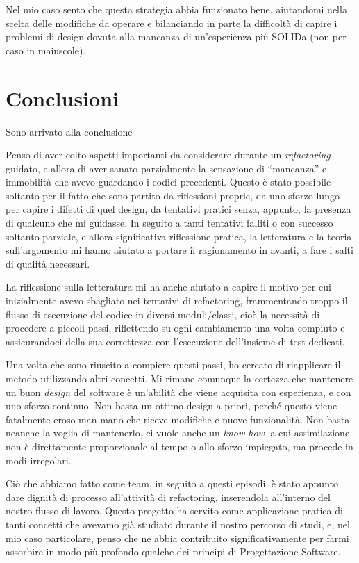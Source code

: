\documentclass[12pt]{report}
\begin{document}
Nel mio caso sento che questa strategia abbia funzionato bene, aiutandomi
nella scelta delle modifiche da operare e bilanciando in parte la
difficoltà di capire i problemi di design dovuta alla mancanza di un'esperienza
più SOLIDa (non per caso in maiuscole).

\chapter{Conclusioni}

Sono arrivato alla conclusione

Penso di aver colto aspetti importanti da considerare durante un 
\textit{refactoring} guidato, e allora di aver sanato parzialmente la
sensazione di ``mancanza'' e immobilità che avevo guardando i codici 
precedenti. Questo è stato possibile soltanto per il fatto che sono 
partito da riflessioni proprie, da uno sforzo lungo per capire i 
difetti di quel design, da tentativi pratici senza, appunto, 
la presenza di qualcuno che mi guidasse. In seguito a tanti tentativi
falliti o con successo soltanto parziale, e allora significativa riflessione
pratica, la letteratura e la teoria sull'argomento mi hanno aiutato a 
portare il ragionamento in avanti, a fare i salti di qualità
necessari.

La riflessione sulla letteratura mi ha anche aiutato a capire il 
motivo per cui inizialmente avevo sbagliato nei tentativi di refactoring,
frammentando troppo il flusso di esecuzione del codice 
in diversi moduli/classi, cioè la necessità
di procedere a piccoli passi, riflettendo su ogni
cambiamento una volta compiuto e assicurandoci della sua correttezza con
l'esecuzione dell'insieme di test dedicati. 

Una volta che sono riuscito a compiere questi passi, ho cercato di riapplicare
il metodo utilizzando altri concetti. Mi rimane comunque la certezza che
mantenere un buon \textit{design} del software è un'abilità che viene acquisita
con esperienza, e con uno sforzo continuo. Non basta un ottimo design a
priori, perché questo viene fatalmente eroso man mano che riceve modifiche
e nuove funzionalità. Non basta neanche la voglia di mantenerlo, ci vuole
anche un \textit{know-how} la cui assimilazione non è direttamente 
proporzionale al tempo o allo sforzo impiegato, ma procede in modi irregolari.

Ciò che abbiamo fatto come team, in seguito a questi episodi, è stato appunto
dare dignità di processo all'attività di refactoring, inserendola all'interno
del nostro flusso di lavoro. Questo progetto ha servito come applicazione 
pratica di tanti concetti che avevamo già studiato durante il nostro percorso
di studi, e, nel mio caso particolare, penso che ne abbia contribuito 
significativamente per farmi assorbire in modo più profondo qualche dei
principi di Progettazione Software.
\end{document}
